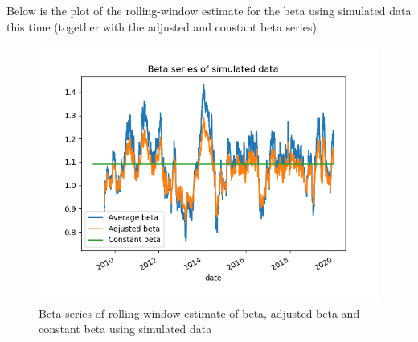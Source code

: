 \documentclass[10pt]{article}
\newenvironment{exercise}[2][Exercise]{\begin{trivlist}
  \item[\hskip \labelsep {\bfseries #1}\hskip \labelsep {\bfseries #2.}]}{\end{trivlist}}
\begin{document}
\begin{exercise}{2}
	Below is the plot of the rolling-window estimate for the beta using simulated data this time (together with the adjusted and constant beta series)
	
	\begin{figure}[H]
	
		\centering
		\includegraphics[scale=0.8]{figures/ex2_3.png}	
		\caption{Beta series of rolling-window estimate of beta, adjusted beta and constant beta using simulated data}
		\label{fig:ex2_2}
				
	\end{figure}
		
\end{exercise}

\newpage
\end{document}
